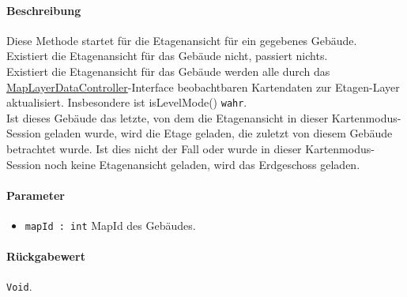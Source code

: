 \paragraph*{Beschreibung}
Diese Methode startet für die Etagenansicht für ein gegebenes Gebäude.\\
Existiert die Etagenansicht für das Gebäude nicht, passiert nichts.\\
Existiert die Etagenansicht für das Gebäude werden alle durch das \hyperref[App_Map_ViewModel_MapLayerDataController]{MapLayerDataController}-Interface beobachtbaren 
Kartendaten zur Etagen-Layer aktualisiert. Insbesondere ist isLevelMode() \texttt{wahr}.\\
Ist dieses Gebäude das letzte, von dem die Etagenansicht in dieser Kartenmodus-Session geladen wurde, wird die 
Etage geladen, die zuletzt von diesem Gebäude betrachtet wurde.
Ist dies nicht der Fall oder wurde in dieser Kartenmodus-Session noch keine Etagenansicht geladen, wird das Erdgeschoss geladen.
\paragraph*{Parameter}
\begin{itemize}
    \item \texttt{mapId : int} MapId des Gebäudes.
\end{itemize}
\paragraph*{Rückgabewert}
\texttt{Void}.
